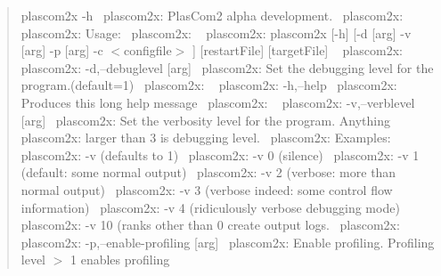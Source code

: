  \begin{quote}
plascom2x -\/h~\newline
plascom2x\+: Plas\+Com2 alpha development.~\newline
plascom2x\+: ~\newline
plascom2x\+: Usage\+:~\newline
 plascom2x\+: ~\newline
plascom2x\+: plascom2x \mbox{[}-\/h\mbox{]} \mbox{[}-\/d \mbox{[}arg\mbox{]} -\/v \mbox{[}arg\mbox{]} -\/p \mbox{[}arg\mbox{]} -\/c $<$configfile$>$ \mbox{]} \mbox{[}restart\+File\mbox{]} \mbox{[}target\+File\mbox{]} ~\newline
plascom2x\+: ~\newline
plascom2x\+: -\/d,--debuglevel \mbox{[}arg\mbox{]}~\newline
plascom2x\+: Set the debugging level for the program.(default=1)~\newline
plascom2x\+: ~\newline
plascom2x\+: -\/h,--help~\newline
plascom2x\+: Produces this long help message~\newline
plascom2x\+: ~\newline
plascom2x\+: -\/v,--verblevel \mbox{[}arg\mbox{]}~\newline
plascom2x\+: Set the verbosity level for the program. Anything~\newline
plascom2x\+: larger than 3 is debugging level.~\newline
plascom2x\+: Examples\+:~\newline
plascom2x\+: -\/v (defaults to 1)~\newline
plascom2x\+: -\/v 0 (silence)~\newline
plascom2x\+: -\/v 1 (default\+: some normal output)~\newline
plascom2x\+: -\/v 2 (verbose\+: more than normal output)~\newline
 plascom2x\+: -\/v 3 (verbose indeed\+: some control flow information)~\newline
plascom2x\+: -\/v 4 (ridiculously verbose debugging mode)~\newline
plascom2x\+: -\/v 10 (ranks other than 0 create output logs.~\newline
plascom2x\+: ~\newline
plascom2x\+: -\/p,--enable-\/profiling \mbox{[}arg\mbox{]}~\newline
plascom2x\+: Enable profiling. Profiling level $>$ 1 enables profiling~\newline

\end{quote}
